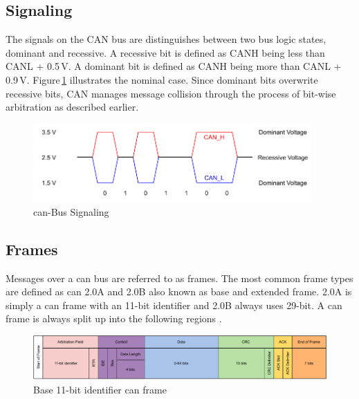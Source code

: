 \subsection{Signaling}
The signals on the CAN bus are distinguishes between two bus logic states, dominant and recessive. A recessive bit is defined as CANH being less than CANL + 0.5\,V. A dominant bit is defined as CANH being more than CANL + 0.9\,V. Figure\,\ref{fig:can-signaling} illustrates the nominal case. Since dominant bits overwrite recessive bits, CAN manages message collision through the process of bit-wise arbitration as described earlier.

\begin{figure}[h!]
	\centering
	\includegraphics[height=3cm]{images/can-signaling}
	\caption{\acrshort{can}-Bus Signaling}
	\label{fig:can-signaling}
\end{figure}

\subsection{Frames}
Messages over a \acrshort{can} bus are referred to as frames. The most common frame types are defined as \acrshort{can} 2.0A and 2.0B also known as base and extended frame. 2.0A is simply a \acrshort{can} frame with an 11-bit identifier and 2.0B always uses 29-bit. A \acrshort{can} frame is always split up into the following regions \cite{can_bus_tutorial}.

\begin{figure}[h!]
	\centering
	\includegraphics[width=\textwidth]{images/can-frame}
	\caption{Base 11-bit identifier \acrshort{can} frame}
	\label{fig:can-frame}
\end{figure}

